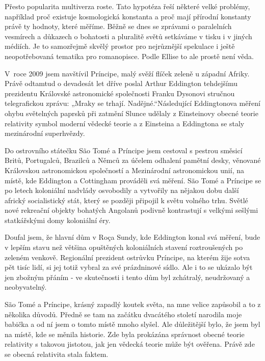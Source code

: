   Přesto popularita multiverza roste. Tato hypotéza řeší některé velké problémy, například proč
  existuje kosmologická konstanta a proč mají přírodní konstanty právě ty hodnoty, které měříme.
  Běžně se dnes se zprávami o paralelních vesmírech a důkazech o bohatosti a pluralitě světů
  setkáváme v tisku i v jiných médiích. Je to samozřejmě skvělý prostor pro nejrůznější spekulace i
  ještě neopotřebovaná tematika pro romanopisce. Podle Ellise to ale prostě není věda. 
  
  V roce 2009 jsem navštívil Príncipe, malý svěží flíček zeleně u západní Afriky. Právě odtamtud o
  devadesát let dříve poslal Arthur Eddington tehdejšímu prezidentu Královské astronomické
  společnosti Franku Dysonovi stručnou telegrafickou zprávu: „Mraky se trhají. Nadějné.“Následující
  Eddingtonova měření ohybu světelných paprsků při zatmění Slunce udělaly z Einsteinovy obecné
  teorie relativity symbol moderní vědecké teorie a z Einsteina a Eddingtona se staly mezinárodní
  superhvězdy. 
  
  Do ostrovního státečku São Tomé a Príncipe jsem cestoval s pestrou směsicí Britů, Portugalců,
  Brazilců a Němců za účelem odhalení pamětní desky, věnované Královskou astronomickou společností a
  Mezinárodní astronomickou unií, na místě, kde Eddington a Cottingham prováděli svá měření. São
  Tomé a Príncipe se po letech koloniální nadvlády osvobodily a vytvořily na nějakou dobu další
  africký socialistický stát, který se později připojil k světu volného trhu. Světlé nové rekreační
  objekty bohatých Angolanů podivně kontrastují s velkými sešlými statkářskými domy koloniální éry.
  
  Doufal jsem, že hlavní dům v Roça Sundy, kde Eddington konal svá měření, bude v lepším stavu než
  většina opuštěných koloniálních stavení roztroušených po zeleném venkově. Regionální prezident
  ostrůvku Príncipe, na kterém žije sotva pět tisíc lidí, si jej totiž vybral za své prázdninové
  sídlo. Ale i to se ukázalo být jen zbožným přáním - ve skutečnosti i tento dům byl zchátralý,
  neudržovaný a neobyvatelný. 
  
  São Tomé a Príncipe, krásný zapadlý koutek světa, na mne velice zapůsobil a to z několika důvodů.
  Předně se tam na začátku dvacátého století narodila moje babička a od ní jsem o tomto místě mnoho
  slyšel. Ale důležitější bylo, že jsem byl na místě, kde se měnila historie. Zde byla prokázána
  správnost obecné teorie relativity s takovou jistotou, jak jen vědecká teorie může být ověřena.
  Právě zde se obecná relativita stala faktem. 
  
